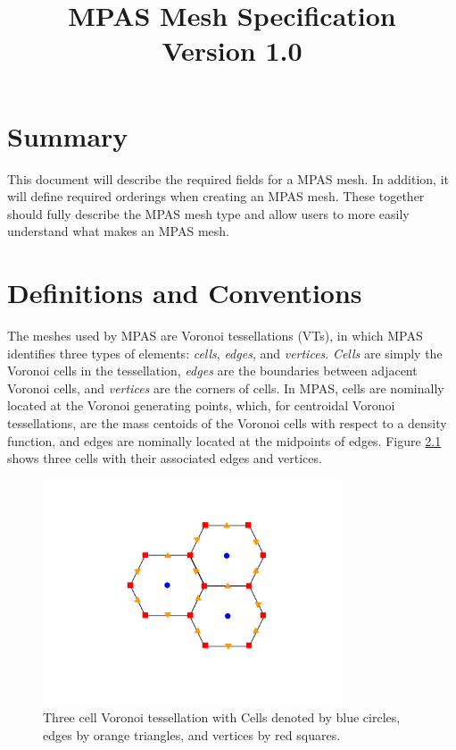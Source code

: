 \documentclass[11pt]{report}
\begin{document}
\title{MPAS Mesh Specification \\ Version 1.0}

\maketitle
\tableofcontents


\chapter{Summary}


This document will describe the required fields for a MPAS mesh. In addition, it
will define required orderings when creating an MPAS mesh. These together
should fully describe the MPAS mesh type and allow users to more easily
understand what makes an MPAS mesh.


\chapter{Definitions and Conventions}

The meshes used by MPAS are Voronoi tessellations (VTs), in which MPAS
identifies three types of elements: {\it cells}, {\it edges}, and {\it
vertices}. {\it Cells} are simply the Voronoi cells in the tessellation, {\it
edges} are the boundaries between adjacent Voronoi cells, and {\it vertices}
are the corners of cells. In MPAS, cells are nominally located at the Voronoi
generating points, which, for centroidal Voronoi tessellations, are the mass
centoids of the Voronoi cells with respect to a density function, and edges are
nominally located at the midpoints of edges. Figure \ref{fig:voronoi} shows
three cells with their associated edges and vertices.

\begin{figure}[htb]
\begin{center}
\includegraphics[width=3.5in]{figures/Voronoi.pdf}
\caption{Three cell Voronoi tessellation with Cells denoted by blue circles, edges by orange triangles, and vertices by red squares.}
\label{fig:voronoi}
\end{center}
\end{figure}
\end{document}
